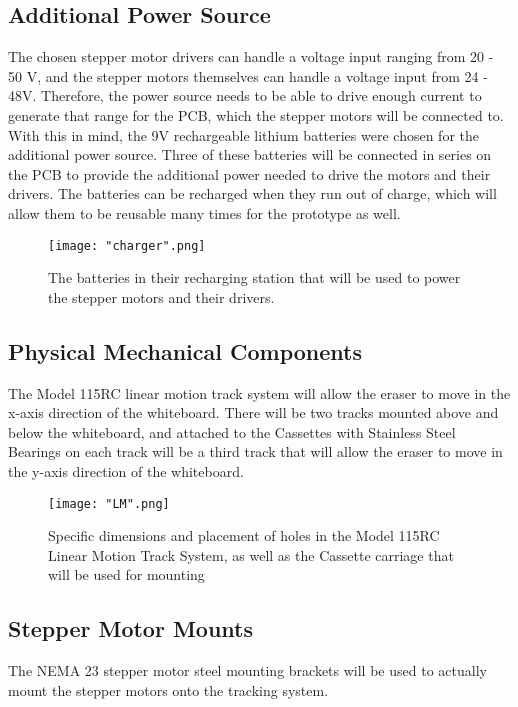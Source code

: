 \subsection {Additional Power Source}

The chosen stepper motor drivers can handle a voltage input ranging from 20 - 50 V, and the stepper motors themselves can handle a voltage input from 24 - 48V. Therefore, the power source needs to be able to drive enough current to generate that range for the PCB, which the stepper motors will be connected to. With this in mind, the 9V rechargeable lithium batteries were chosen for the additional power source. Three of these batteries will be connected in series on the PCB to provide the additional power needed to drive the motors and their drivers. The batteries can be recharged when they run out of charge, which will allow them to be reusable many times for the prototype as well.

\begin{figure}[H]
	\centering
	{\texttt{[image: "charger".png]}}
	\caption{ The batteries in their recharging station that will be used to power the stepper motors and their drivers.
		\cite{ebl}}
	\label{fig:charger}
\end{figure}

\subsection{Physical Mechanical Components}

The Model 115RC linear motion track system will allow the eraser to move in the x-axis direction of the whiteboard. There will be two tracks mounted above and below the whiteboard, and attached to the Cassettes with Stainless Steel Bearings on each track will be a third track that will allow the eraser to move in the y-axis direction of the whiteboard. 

\begin{figure}[H]
	\centering
	{\texttt{[image: "LM".png]}}
	\caption{ Specific dimensions and placement of holes in the Model 115RC Linear Motion Track System, as well as the Cassette carriage that will be used for mounting
		\cite{accuride}}
	\label{fig:LM}
\end{figure}

\subsection{Stepper Motor Mounts}
The NEMA 23 stepper motor steel mounting brackets will be used to actually mount the stepper motors onto the tracking system.

